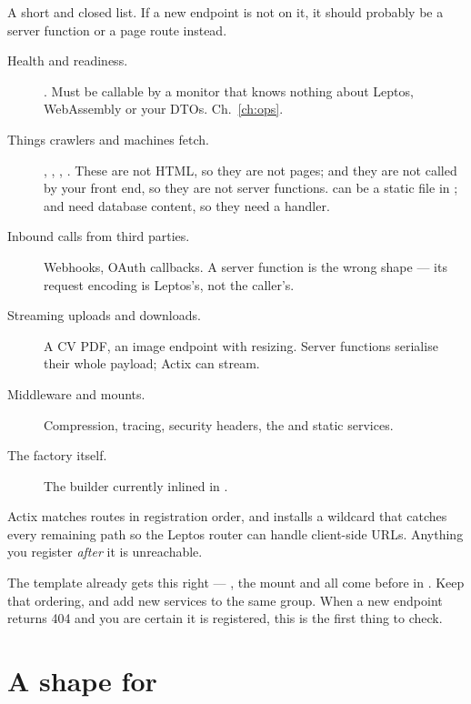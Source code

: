 A short and closed list. If a new endpoint is not on it, it should probably be a server function or
a page route instead.

\begin{description}
  \item[Health and readiness.] . Must be callable by a monitor that knows nothing
    about Leptos, WebAssembly or your DTOs. Ch.~\ref{ch:ops}.
  \item[Things crawlers and machines fetch.] , ,
    , . These are not HTML, so they are not pages; and they are
    not called by your front end, so they are not server functions.  can be a
    static file in ;  and  need database content, so
    they need a handler.
  \item[Inbound calls from third parties.] Webhooks, OAuth callbacks. A server function is the
    wrong shape --- its request encoding is Leptos's, not the caller's.
  \item[Streaming uploads and downloads.] A CV PDF, an image endpoint with resizing. Server
    functions serialise their whole payload; Actix can stream.
  \item[Middleware and mounts.] Compression, tracing, security headers, the  and
     static services.
  \item[The  factory itself.] The builder currently inlined in .
\end{description}

\begin{pitfall}
Actix matches routes in registration order, and  installs a wildcard that
catches every remaining path so the Leptos router can handle client-side URLs. Anything you register
\emph{after} it is unreachable.

The template already gets this right --- , the  mount and
 all come before  in . Keep that ordering, and
add new services to the same group. When a new endpoint returns 404 and you are certain it is
registered, this is the first thing to check.
\end{pitfall}

\section{A shape for }

